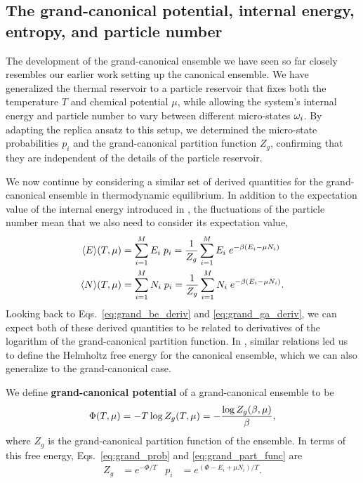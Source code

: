 \subsection{\label{sec:grand_pot}The grand-canonical potential, internal energy, entropy, and particle number}
The development of the grand-canonical ensemble we have seen so far closely resembles our earlier work setting up the canonical ensemble.
We have generalized the thermal reservoir to a particle reservoir that fixes both the temperature $T$ and chemical potential $\mu$, while allowing the system's internal energy and particle number to vary between different micro-states $\omega_i$.
By adapting the replica ansatz to this setup, we determined the micro-state probabilities $p_i$ and the grand-canonical partition function $Z_g$, confirming that they are independent of the details of the particle reservoir.

We now continue by considering a similar set of derived quantities for the grand-canonical ensemble in thermodynamic equilibrium.
In addition to the expectation value of the internal energy introduced in , the fluctuations of the particle number mean that we also need to consider its expectation value,
\begin{align*}
  \left\langle E \right\rangle\!(T, \mu) & = \sum_{i = 1}^M E_i \; p_i = \frac{1}{Z_g} \sum_{i = 1}^M E_i \; e^{-\beta (E_i - \mu N_i)} \\
  \left\langle N \right\rangle\!(T, \mu) & = \sum_{i = 1}^M N_i \; p_i = \frac{1}{Z_g} \sum_{i = 1}^M N_i \; e^{-\beta (E_i - \mu N_i)}.
\end{align*}
Looking back to Eqs.~\ref{eq:grand_be_deriv} and \ref{eq:grand_ga_deriv}, we can expect both of these derived quantities to be related to derivatives of the logarithm of the grand-canonical partition function.
In , similar relations led us to define the Helmholtz free energy for the canonical ensemble, which we can also generalize to the grand-canonical case.

\begin{shaded}
  We define \textbf{grand-canonical potential} of a grand-canonical ensemble to be
  \begin{equation}
    \label{eq:grand_pot}
    \Phi(T, \mu) = -T \log Z_g(T, \mu) = -\frac{\log Z_g(\beta, \mu)}{\beta},
  \end{equation}
  where $Z_g$ is the grand-canonical partition function of the ensemble.
  In terms of this free energy, Eqs.~\ref{eq:grand_prob} and \ref{eq:grand_part_func} are
  \begin{align*}
    Z_g & = e^{-\Phi / T} &
    p_i & = e^{(\Phi - E_i + \mu N_i) / T}.
  \end{align*}
\end{shaded}


